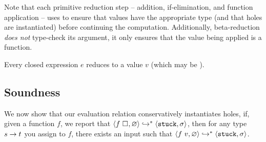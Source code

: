 %

Note that each primitive reduction step -- addition, if-elimination, and
function application -- uses \forcesym to ensure that values have the
appropriate type (and that holes are instantiated) before continuing the
computation.
%
Additionally, beta-reduction \emph{does not} type-check its argument, it
only ensures that the value being applied is a function.
%
\begin{thm}
\label{thm:all-reduce}
  Every closed expression $e$ reduces to a value $v$ (which may be \stuck).
\end{thm}

%
%
\subsection{Soundness}
\label{sec:soundness}
We now show that our evaluation relation conservatively instantiates
holes, \ie if, given a function $f$, we report that
$\langle f \ \square_{}, \varnothing \rangle \hookrightarrow^{*} \langle \mathtt{stuck}, \sigma \rangle$,
then for any type ${s} \rightarrow t$ you assign to $f$, there exists an input  such that
$\langle f \ v, \varnothing \rangle \hookrightarrow^{*} \langle \mathtt{stuck}, \sigma \rangle$.

